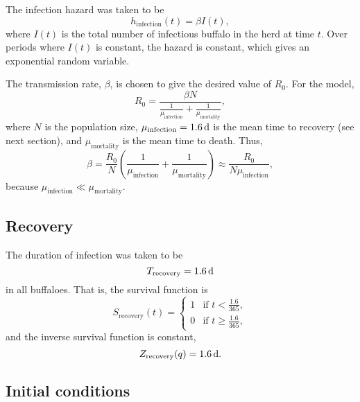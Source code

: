 \documentclass{jpmarticle}
\begin{document}
The infection hazard was taken to be
\begin{equation}
  h_{\text{infection}}(t) = \beta I(t),
\end{equation}
where $I(t)$ is the total number of infectious buffalo in the herd at
time $t$.  Over periods where $I(t)$ is constant, the hazard is
constant, which gives an exponential random variable.

The transmission rate, $\beta$, is chosen to give the desired value of
$R_0$.  For the model,
\begin{equation}
  R_0 = \frac{\beta N}{\frac{1}{\mu_{\text{infection}}}
    + \frac{1}{\mu_{\text{mortality}}}},
\end{equation}
where $N$ is the population size,
$\mu_{\text{infection}} = \unit[1.6]{d}$ is the mean time to recovery
(see next section), and $\mu_{\text{mortality}}$ is the mean time to
death.  Thus,
\begin{equation}
  \beta = \frac{R_0}{N}
  \left(\frac{1}{\mu_{\text{infection}}} +
    \frac{1}{\mu_{\text{mortality}}}\right)
  \approx \frac{R_0}{N \mu_{\text{infection}}},
\end{equation}
because $\mu_{\text{infection}} \ll \mu_{\text{mortality}}$.

\subsection{Recovery}

The duration of infection was taken to be
\begin{equation}
  T_{\text{recovery}} = \unit[1.6]{d}
\end{equation}
in all buffaloes.  That is, the survival function is
\begin{equation}
  S_{\text{recovery}}(t) =
  \begin{cases}
    1 & \text{if $t < \frac{1.6}{365}$},
    \\
    0 & \text{if $t \geq \frac{1.6}{365}$},
  \end{cases}
\end{equation}
and the inverse survival function is constant,
\begin{equation}
  Z_{\text{recovery}}(q) = \unit[1.6]{d}.
\end{equation}


\subsection{Initial conditions}
\end{document}

